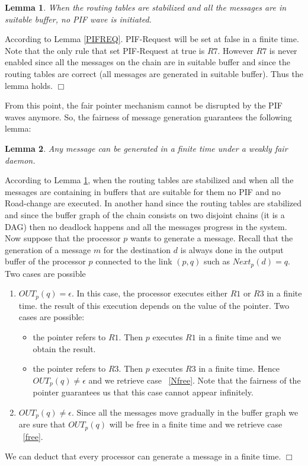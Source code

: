 \documentclass{llncs}
\renewenvironment{proof}{{\it Proof. } }{{\hfill $\Box$}\vspace{.5pc}}
\newtheorem{lem}{Lemma}
\begin{document}
\begin{lem}\label{NOPIF}
When the routing tables are stabilized and all the messages are in suitable buffer, no PIF wave is initiated.
\end{lem}  

\begin{proof}
According to Lemma \ref{PIFREQ}. PIF-Request will be set at false in a finite time. Note that the only rule that set PIF-Request at true is $R7$. However $R7$ is never enabled since all the messages on the chain are in suitable buffer and since the routing tables are correct (all messages are generated in suitable buffer). Thus the lemma holds.
\end{proof}

From this point, the fair pointer mechanism cannot be disrupted by the PIF waves anymore. So, the fairness of message
generation guarantees the following lemma:
\begin{lem}\label{GMSG}
Any message can be generated in a finite time under a weakly fair daemon.
\end{lem}

\begin{proof}
According to Lemma \ref{NOPIF}, when the routing tables are stabilized and when all the messages are containing in
buffers that are suitable for them no PIF and no Road-change are executed. In another hand since the routing tables
are stabilized and since the buffer graph of the chain consists on two disjoint chains  (it is a DAG) then no deadlock
happens and all the messages progress in the system. Now suppose that the processor $p$ wants to generate a message. Recall that the generation of a message $m$ for the destination $d$ is always done in the output buffer of the processor $p$ connected to the link $(p,q)$ such as $Next_{p}(d)=q$. Two cases are possible
\begin{enumerate}
\item\label{free}{$OUT_{p}(q)=\epsilon$}. In this case, the processor executes either $R1$ or $R3$ in a finite time. the result of this execution depends on the value of the pointer. Two cases are possible:
\begin{itemize}
\item{the pointer refers to $R1$.} Then $p$ executes $R1$ in a finite time and we obtain the result.
\item{the pointer refers to $R3$.} Then $p$ executes $R3$ in a finite time. Hence $OUT_{p}(q)\ne\epsilon$ and we retrieve case ~\ref{Nfree}. Note that the fairness of the pointer guarantees us that this case cannot appear infinitely.
\end{itemize}
\item\label{Nfree}{$OUT_{p}(q)\ne\epsilon$.} Since all the messages move gradually in the buffer graph we are sure that $OUT_{p}(q)$ will be free in a finite time and we retrieve case  ~\ref{free}. \\
\end{enumerate} 
We can deduct that every processor can generate a message in a finite time.
\end{proof}
\end{document}
